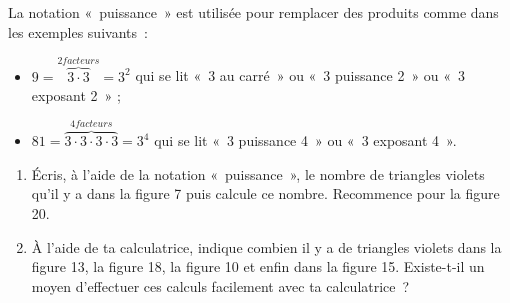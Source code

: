 \begin{activite}
\begin{partie}
La notation « puissance » est utilisée pour remplacer des produits comme dans les exemples suivants :
\begin{itemize}
 \item $9 = \stackrel{2 facteurs}{\overbrace{3 \cdot 3}} = 3^2$ qui se lit « 3 au carré » ou « 3 puissance 2 » ou « 3 exposant 2 » ;
 \item $81 = \stackrel{4 facteurs}{\overbrace{3 \cdot 3 \cdot 3 \cdot 3}} = 3^4$ qui se lit « 3 puissance 4 » ou « 3 exposant 4 ».
 \end{itemize}
\begin{enumerate}
 \item Écris, à l'aide de la notation « puissance », le nombre de triangles violets qu'il y a dans la figure 7 puis calcule ce nombre. Recommence pour la figure 20.
 \item À l'aide de ta calculatrice, indique combien il y a de triangles violets dans la figure 13, la figure 18, la figure 10 et enfin dans la figure 15. Existe-t-il un moyen d'effectuer ces calculs facilement avec ta calculatrice ?
 \end{enumerate}
\end{partie}

\end{activite}


